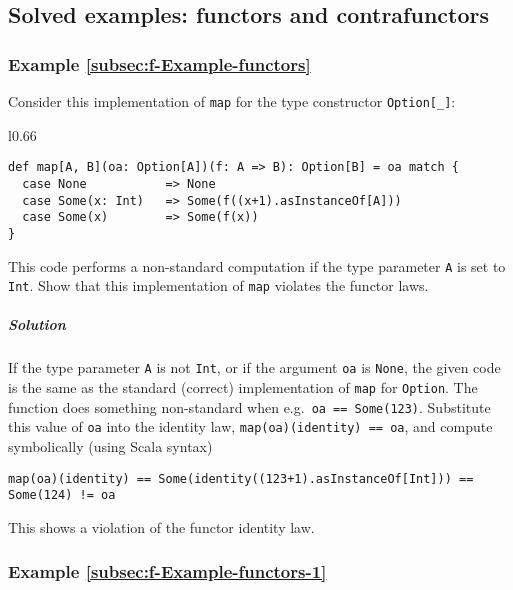 \subsection{Solved examples: functors and contrafunctors}

\subsubsection{Example \label{subsec:f-Example-functors}\ref{subsec:f-Example-functors}}

Consider this implementation of \lstinline!map! for the type constructor
\lstinline!Option[_]!:

\begin{wrapfigure}{l}{0.66\columnwidth}%
\vspace{-0.8\baselineskip}
\begin{lstlisting}
def map[A, B](oa: Option[A])(f: A => B): Option[B] = oa match {
  case None           => None
  case Some(x: Int)   => Some(f((x+1).asInstanceOf[A]))
  case Some(x)        => Some(f(x))
}
\end{lstlisting}

\vspace{-1\baselineskip}
\end{wrapfigure}%

\noindent This code performs a non-standard computation if the type
parameter \lstinline!A! is set to \lstinline!Int!. Show that this
implementation of \lstinline!map! violates the functor laws.

\subparagraph{Solution}

If the type parameter \lstinline!A! is not \lstinline!Int!, or if
the argument \lstinline!oa! is \lstinline!None!, the given code
is the same as the standard (correct) implementation of \lstinline!map!
for \lstinline!Option!. The function does something non-standard
when e.g.~\lstinline!oa == Some(123)!. Substitute this value of
\lstinline!oa! into the identity law, \lstinline!map(oa)(identity) == oa!,
and compute symbolically (using Scala syntax)
\begin{lstlisting}
map(oa)(identity) == Some(identity((123+1).asInstanceOf[Int])) == Some(124) != oa
\end{lstlisting}
This shows a violation of the functor identity law.

\subsubsection{Example \label{subsec:f-Example-functors-1}\ref{subsec:f-Example-functors-1}}

